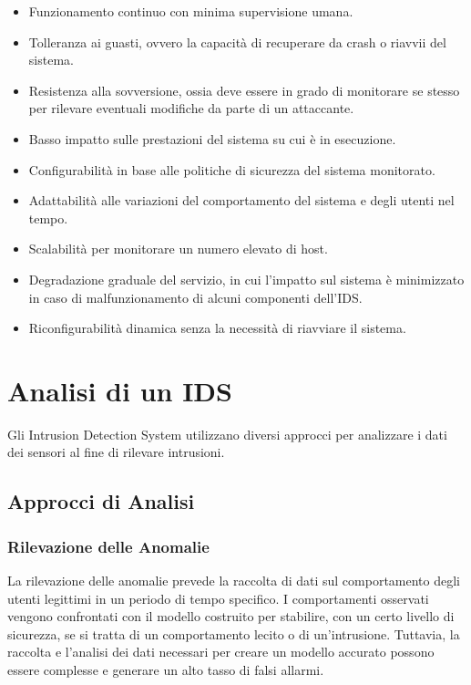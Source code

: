 \begin{itemize}
    \item Funzionamento continuo con minima supervisione umana.
    \item Tolleranza ai guasti, ovvero la capacità di recuperare da crash o riavvii del sistema.
    \item Resistenza alla sovversione, ossia deve essere in grado di monitorare se stesso per rilevare eventuali modifiche da parte di un attaccante.
    \item Basso impatto sulle prestazioni del sistema su cui è in esecuzione.
    \item Configurabilità in base alle politiche di sicurezza del sistema monitorato.
    \item Adattabilità alle variazioni del comportamento del sistema e degli utenti nel tempo.
    \item Scalabilità per monitorare un numero elevato di host.
    \item Degradazione graduale del servizio, in cui l'impatto sul sistema è minimizzato in caso di malfunzionamento di alcuni componenti dell'IDS.
    \item Riconfigurabilità dinamica senza la necessità di riavviare il sistema.
\end{itemize}

\section{Analisi di un IDS}

Gli Intrusion Detection System utilizzano diversi approcci per analizzare i dati dei sensori al fine di rilevare intrusioni.

\subsection{Approcci di Analisi}

\subsubsection{Rilevazione delle Anomalie}

La rilevazione delle anomalie prevede la raccolta di dati sul comportamento degli utenti legittimi in un periodo di tempo specifico. I comportamenti osservati vengono confrontati con il modello costruito per stabilire, con un certo livello di sicurezza, se si tratta di un comportamento lecito o di un'intrusione. Tuttavia, la raccolta e l'analisi dei dati necessari per creare un modello accurato possono essere complesse e generare un alto tasso di falsi allarmi.

